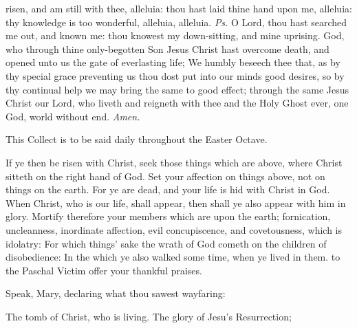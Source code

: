 \introit
{} risen, and am still with thee, alleluia: thou hast laid thine hand upon me, alleluia: thy knowledge is too wonderful, alleluia, alleluia. \textit{Ps.} O Lord, thou hast searched me out, and known me: thou knowest my down-sitting, and mine uprising.
\collect
{} God, who through thine only-begotten Son Jesus Christ hast overcome death, and opened unto us the gate of everlasting life; We humbly beseech thee that, as by thy special grace preventing us thou dost put into our minds good desires, so by thy continual help we may bring the same to good effect; through the same Jesus Christ our Lord, who liveth and reigneth with thee and the Holy Ghost ever, one God, world without end. \textit{Amen.}
\begin{rubric}
    This Collect is to be said daily throughout the Easter Octave.
\end{rubric}
 If ye then be risen with Christ, seek those things which are above, where Christ sitteth on the right hand of God. Set your affection on things above, not on things on the earth. For ye are dead, and your life is hid with Christ in God. When Christ, who is our life, shall appear, then shall ye also appear with him in glory. Mortify therefore your members which are upon the earth; fornication, uncleanness, inordinate affection, evil concupiscence, and covetousness, which is idolatry: For which things' sake the wrath of God cometh on the children of disobedience: In the which ye also walked some time, when ye lived in them.
\label{PaschalSequence}
 to the Paschal Victim offer your thankful praises.\par
{}
Speak, Mary, declaring what thou sawest wayfaring:\par
The tomb of Christ, who is living. The glory of Jesu's Resurrection;\par
